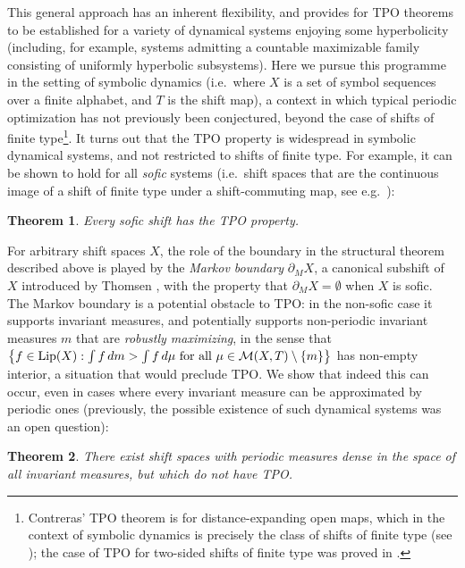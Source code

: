 \documentclass[reqno,11pt]{amsart}
\newtheorem{thm}{Theorem}[section]
\theoremstyle{definition}
\theoremstyle{remark}
\theoremstyle{remark}
\def\m{\mathcal M}
\def\lip{{\rm Lip}}
\numberwithin{equation}{section}
\begin{document}
This general approach has an inherent flexibility, and provides for TPO theorems to be established for a variety of
dynamical systems enjoying some hyperbolicity (including, for example, systems admitting a countable maximizable family
consisting of uniformly hyperbolic subsystems).
Here we pursue this programme in the setting of symbolic dynamics (i.e.~where $X$ is a set of symbol sequences over a finite alphabet, and $T$ is the shift map), a context in which typical periodic optimization has not previously been conjectured, beyond the case of shifts of finite type\footnote{Contreras' TPO theorem \cite{C02} is for distance-expanding open maps, which in the context of symbolic dynamics is precisely the class of shifts of finite type
(see 
\cite[Thm.~1]{Pa66}); the case of TPO for two-sided shifts of finite type was proved in \cite{HLMXZ19}.}.
It turns out that the TPO property is widespread in symbolic dynamical systems, and not restricted to shifts of finite type. 
For example, it can be shown to hold for all \emph{sofic} systems
 (i.e.~shift spaces that are the continuous image of a shift of finite type under a shift-commuting map, 
see e.g.~\cite{LM95, Wei73}):

\begin{thm}\label{sofictpointrotheorem}
Every sofic shift has the 
TPO
property.
\end{thm}

For arbitrary shift spaces $X$, the role of the boundary in the structural theorem described above is played by
 the \emph{Markov boundary} $\partial_M X$,  a canonical subshift of $X$
introduced by Thomsen \cite{Tho06}, 
with the property that $\partial_M X=\emptyset$ when $X$ is sofic.
The Markov boundary is a potential obstacle to TPO: in the non-sofic case it
supports invariant measures, 
and potentially supports non-periodic invariant measures $m$ that are \emph{robustly maximizing}, in the sense
that $\left\{f\in \lip(X): \int f\, dm > \int f\, d\mu\text{ for all }\mu\in\m(X,T)\setminus\{m\}\right\}$ has non-empty interior, a 
situation
that would
preclude TPO.
We show that indeed this can occur, even in cases where every invariant measure can be approximated by periodic ones
(previously, the possible existence of such dynamical systems was an open question):

\begin{thm}\label{non_tpo}
There exist 
shift spaces with periodic measures dense in the space of all invariant measures,
but which do not have TPO.
\end{thm}
\end{document}
